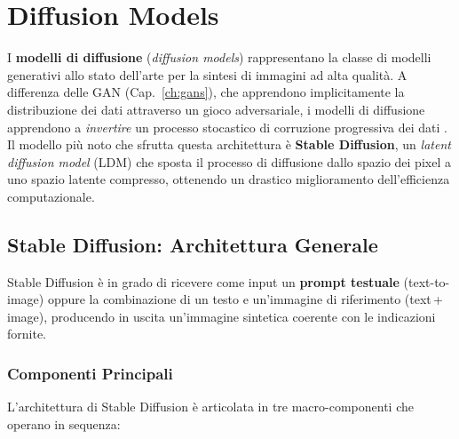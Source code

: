 \chapter{Diffusion Models}
\label{ch:diffusion}

I \textbf{modelli di diffusione} (\emph{diffusion models}) rappresentano
la classe di modelli generativi allo stato dell'arte per la sintesi di
immagini ad alta qualità. A differenza delle GAN (Cap.~\ref{ch:gans}),
che apprendono implicitamente la distribuzione dei dati attraverso un
gioco adversariale, i modelli di diffusione apprendono a \emph{invertire}
un processo stocastico di corruzione progressiva dei dati
\citep{bishop2024}. Il modello più noto che sfrutta questa architettura
è \textbf{Stable Diffusion}, un \emph{latent diffusion model} (LDM) che
sposta il processo di diffusione dallo spazio dei pixel a uno spazio
latente compresso, ottenendo un drastico miglioramento dell'efficienza
computazionale.

\section{Stable Diffusion: Architettura Generale}
\label{sec:sd-architecture}

Stable Diffusion è in grado di ricevere come input un \textbf{prompt
testuale} (text-to-image) oppure la combinazione di un testo e
un'immagine di riferimento (text\,+\,image), producendo in uscita
un'immagine sintetica coerente con le indicazioni fornite.

\subsection{Componenti Principali}
\label{subsec:sd-components}

L'architettura di Stable Diffusion è articolata in tre macro-componenti
che operano in sequenza:

